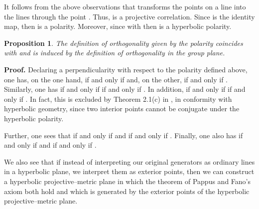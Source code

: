 \documentclass[a4paper,twoside,12pt]{article}
\newtheorem{prop}{Proposition}[section]
\newenvironment{proof}{\medskip \noindent 
            {\bf Proof.}}{ \hfill \myHighlight{$\square$}\coordHE{} \medskip}
\begin{document}
     It follows from the above observations that \myHighlight{$\Phi$}\coordHE{} transforms
the points \coordHE{} on a line \coordHE{} into the lines \coordHE{}
through the point \coordHE{}. Thus, \myHighlight{$\Phi$}\coordHE{} is a projective
correlation. Since \coordHE{} is the identity map, then \myHighlight{$\Phi$}\coordHE{} is a
polarity. Moreover, since \coordHE{}
with \coordHE{} then \myHighlight{$\Phi$}\coordHE{} is a
hyperbolic polarity.

\begin{prop} The definition of orthogonality given by the polarity
coincides with and is induced by the definition of orthogonality in 
the group plane.
\end{prop}

\begin{proof} Declaring a perpendicularity with respect to the
polarity defined above, one has, on the one hand, \coordHE{} 
if and only if \coordHE{} and, on the other, 
\coordHE{} if and only if \coordHE{}. Similarly, one has
\coordHE{} if and only if \coordHE{} if and
only if \coordHE{}. In addition, \coordHE{} if and only if 
\coordHE{} if and only if \coordHE{}. In fact, this is
excluded by Theorem 2.1(c) in \cite{BBPW}, in conformity with hyperbolic 
geometry, since two interior points cannot be conjugate under the 
hyperbolic polarity.

     Further, one sees that \coordHE{} if and only if 
\coordHE{} and \coordHE{} if and only if 
\coordHE{}. Finally, one also has \coordHE{} if and only if 
\coordHE{} and \coordHE{} if and only if
\coordHE{}.
\end{proof}

     We also see that if instead of interpreting our original
generators as ordinary lines in a hyperbolic plane, we interpret them
as exterior points, then we can construct a hyperbolic
projective--metric plane in which the theorem of Pappus and Fano's
axiom both hold and which is generated by the exterior points of the
hyperbolic projective--metric plane.
\end{document}
